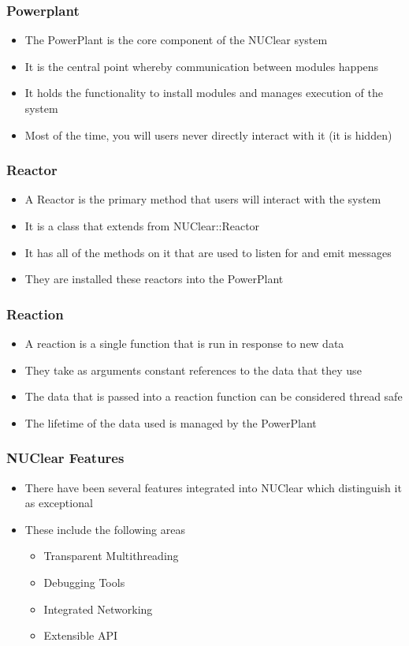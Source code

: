 \documentclass{beamer}
\begin{document}
\begin{frame}
	\frametitle{Powerplant}
	\begin{itemize}
		\item The PowerPlant is the core component of the NUClear system
		\item It is the central point whereby communication between modules happens
		\item It holds the functionality to install modules and manages execution of the system
		\item Most of the time, you will users never directly interact with it (it is hidden)
	\end{itemize}
\end{frame}

\begin{frame}
	\frametitle{Reactor}
	\begin{itemize}
		\item A Reactor is the primary method that users will interact with the system
		\item It is a class that extends from NUClear::Reactor
		\item It has all of the methods on it that are used to listen for and emit messages
		\item They are installed these reactors into the PowerPlant
	\end{itemize}
\end{frame}

\begin{frame}
	\frametitle{Reaction}
	\begin{itemize}
		\item A reaction is a single function that is run in response to new data
		\item They take as arguments constant references to the data that they use
		\item The data that is passed into a reaction function can be considered thread safe
		\item The lifetime of the data used is managed by the PowerPlant
	\end{itemize}
\end{frame}

\begin{frame}
	\frametitle{NUClear Features}
	\begin{itemize}
		\item There have been several features integrated into NUClear which distinguish it as exceptional
		\item These include the following areas
		\begin{itemize}
			\item Transparent Multithreading
			\item Debugging Tools
			\item Integrated Networking
			\item Extensible API
		\end{itemize}
	\end{itemize}
\end{frame}
\end{document}
